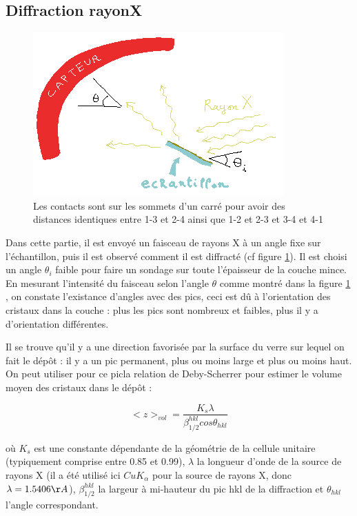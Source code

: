 \documentclass[a4paper,12pt,oneside]{article}
\def \be {\begin{equation}}
\def \ee {\end{equation}}
\begin{document}
\subsection{Diffraction rayonX}

		\begin{figure}[h!]
			\begin{center}
			\includegraphics[width=0.8\linewidth,angle=0]{./figures/illustration_rayon_X.png}
			\caption{Les contacts sont sur les sommets d'un carré pour avoir des distances identiques entre 1-3 et 2-4 ainsi que 1-2 et 2-3 et 3-4 et 4-1} \label{fig:illustration_rayon_X}
			\end{center}
		\end{figure}

Dans cette partie, il est envoyé un faisceau de rayons X à un angle fixe sur l'échantillon, puis il est observé comment il est diffracté (cf figure \ref{fig:illustration_rayon_X}). Il est choisi un angle $\theta_i$ faible pour faire un sondage sur toute l'épaisseur de la couche mince. En mesurant l'intensité du faisceau selon l'angle $\theta$ comme montré dans la figure \ref{fig:illustration_rayon_X} , on constate l'existance d'angles avec des pics, ceci est dû à l'orientation des cristaux dans la couche : plus les pics sont nombreux et faibles, plus il y a d'orientation différentes.

Il se trouve qu'il y a une direction favorisée par la surface du verre sur lequel on fait le dépôt : il y a un pic permanent, plus ou moins large et plus ou moins haut. On peut utiliser pour ce picla relation de Deby-Scherrer pour estimer le volume moyen des cristaux dans le dépôt :

\be
	<z>_{vol}=\frac{K_s\lambda}{\beta^{hkl}_{1/2} cos\theta_{hkl}}
\ee

où $K_s$ est une constante dépendante de la géométrie de la cellule unitaire (typiquement comprise entre 0.85 et 0.99), $\lambda$ la longueur d'onde de la source de rayons X (il a été utilisé ici $Cu K_{\alpha}$ pour la source de rayons X, donc $\lambda = 1.5406 \AA$), $\beta^{hkl}_{1/2}$ la largeur à mi-hauteur du pic hkl de la diffraction et $\theta_{hkl}$ l'angle correspondant.
\end{document}
